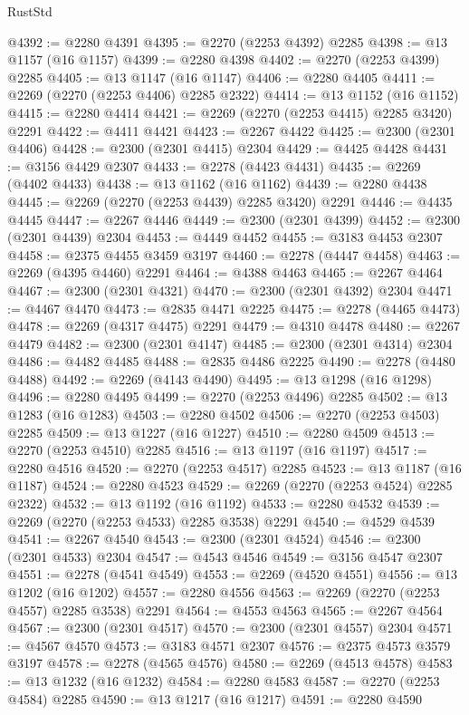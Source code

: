 \begin{lexlean}{RustStd}
\begin{coremodule}
{\begin{coremodule}
{{{{{{{{{{{{@4392 := @2280 @4391
@4395 := @2270 (@2253 @4392) @2285
@4398 := @13 @1157 (@16 @1157)
@4399 := @2280 @4398
@4402 := @2270 (@2253 @4399) @2285
@4405 := @13 @1147 (@16 @1147)
@4406 := @2280 @4405
@4411 := @2269 (@2270 (@2253 @4406) @2285 @2322)
@4414 := @13 @1152 (@16 @1152)
@4415 := @2280 @4414
@4421 := @2269 (@2270 (@2253 @4415) @2285 @3420) @2291
@4422 := @4411 @4421
@4423 := @2267 @4422
@4425 := @2300 (@2301 @4406)
@4428 := @2300 (@2301 @4415) @2304
@4429 := @4425 @4428
@4431 := @3156 @4429 @2307
@4433 := @2278 (@4423 @4431)
@4435 := @2269 (@4402 @4433)
@4438 := @13 @1162 (@16 @1162)
@4439 := @2280 @4438
@4445 := @2269 (@2270 (@2253 @4439) @2285 @3420) @2291
@4446 := @4435 @4445
@4447 := @2267 @4446
@4449 := @2300 (@2301 @4399)
@4452 := @2300 (@2301 @4439) @2304
@4453 := @4449 @4452
@4455 := @3183 @4453 @2307
@4458 := @2375 @4455 @3459 @3197
@4460 := @2278 (@4447 @4458)
@4463 := @2269 (@4395 @4460) @2291
@4464 := @4388 @4463
@4465 := @2267 @4464
@4467 := @2300 (@2301 @4321)
@4470 := @2300 (@2301 @4392) @2304
@4471 := @4467 @4470
@4473 := @2835 @4471 @2225
@4475 := @2278 (@4465 @4473)
@4478 := @2269 (@4317 @4475) @2291
@4479 := @4310 @4478
@4480 := @2267 @4479
@4482 := @2300 (@2301 @4147)
@4485 := @2300 (@2301 @4314) @2304
@4486 := @4482 @4485
@4488 := @2835 @4486 @2225
@4490 := @2278 (@4480 @4488)
@4492 := @2269 (@4143 @4490)
@4495 := @13 @1298 (@16 @1298)
@4496 := @2280 @4495
@4499 := @2270 (@2253 @4496) @2285
@4502 := @13 @1283 (@16 @1283)
@4503 := @2280 @4502
@4506 := @2270 (@2253 @4503) @2285
@4509 := @13 @1227 (@16 @1227)
@4510 := @2280 @4509
@4513 := @2270 (@2253 @4510) @2285
@4516 := @13 @1197 (@16 @1197)
@4517 := @2280 @4516
@4520 := @2270 (@2253 @4517) @2285
@4523 := @13 @1187 (@16 @1187)
@4524 := @2280 @4523
@4529 := @2269 (@2270 (@2253 @4524) @2285 @2322)
@4532 := @13 @1192 (@16 @1192)
@4533 := @2280 @4532
@4539 := @2269 (@2270 (@2253 @4533) @2285 @3538) @2291
@4540 := @4529 @4539
@4541 := @2267 @4540
@4543 := @2300 (@2301 @4524)
@4546 := @2300 (@2301 @4533) @2304
@4547 := @4543 @4546
@4549 := @3156 @4547 @2307
@4551 := @2278 (@4541 @4549)
@4553 := @2269 (@4520 @4551)
@4556 := @13 @1202 (@16 @1202)
@4557 := @2280 @4556
@4563 := @2269 (@2270 (@2253 @4557) @2285 @3538) @2291
@4564 := @4553 @4563
@4565 := @2267 @4564
@4567 := @2300 (@2301 @4517)
@4570 := @2300 (@2301 @4557) @2304
@4571 := @4567 @4570
@4573 := @3183 @4571 @2307
@4576 := @2375 @4573 @3579 @3197
@4578 := @2278 (@4565 @4576)
@4580 := @2269 (@4513 @4578)
@4583 := @13 @1232 (@16 @1232)
@4584 := @2280 @4583
@4587 := @2270 (@2253 @4584) @2285
@4590 := @13 @1217 (@16 @1217)
@4591 := @2280 @4590
}}}}}}}}}}}}
\end{coremodule}}
\end{coremodule}
\end{lexlean}
